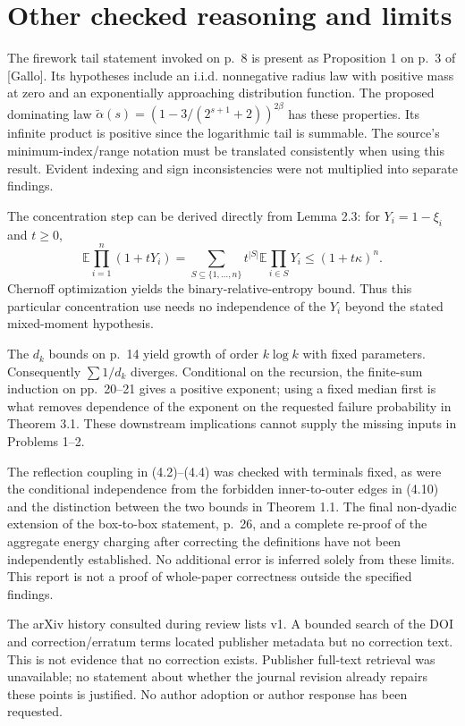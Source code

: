 \documentclass[10pt]{article}
\begin{document}
\section*{Other checked reasoning and limits}
The firework tail statement invoked on p. 8 is present as Proposition 1 on p. 3 of [Gallo]. Its hypotheses include an i.i.d. nonnegative radius law with positive mass at zero and an exponentially approaching distribution function. The proposed dominating law \(\widetilde\alpha(s)=(1-3/(2^{s+1}+2))^{2\beta}\) has these properties. Its infinite product is positive since the logarithmic tail is summable. The source’s minimum-index/range notation must be translated consistently when using this result. Evident indexing and sign inconsistencies were not multiplied into separate findings.\par
The concentration step can be derived directly from Lemma 2.3: for \(Y_i=1-\xi_i\) and \(t\ge0\), \[\mathbb E\prod_{i=1}^{n}(1+tY_i)
 =\sum_{S\subseteq\{1,\ldots,n\}}t^{|S|}\mathbb E\prod_{i\in S}Y_i
 \le(1+t\kappa)^n.\] Chernoff optimization yields the binary-relative-entropy bound. Thus this particular concentration use needs no independence of the \(Y_i\) beyond the stated mixed-moment hypothesis.\par
The \(d_k\) bounds on p. 14 yield growth of order \(k\log k\) with fixed parameters. Consequently \(\sum 1/d_k\) diverges. Conditional on the recursion, the finite-sum induction on pp. 20–21 gives a positive exponent; using a fixed median first is what removes dependence of the exponent on the requested failure probability in Theorem 3.1. These downstream implications cannot supply the missing inputs in Problems 1–2.\par
The reflection coupling in (4.2)–(4.4) was checked with terminals fixed, as were the conditional independence from the forbidden inner-to-outer edges in (4.10) and the distinction between the two bounds in Theorem 1.1. The final non-dyadic extension of the box-to-box statement, p. 26, and a complete re-proof of the aggregate energy charging after correcting the definitions have not been independently established. No additional error is inferred solely from these limits. This report is not a proof of whole-paper correctness outside the specified findings.\par
The arXiv history consulted during review lists v1. A bounded search of the DOI and correction/erratum terms located publisher metadata but no correction text. This is not evidence that no correction exists. Publisher full-text retrieval was unavailable; no statement about whether the journal revision already repairs these points is justified. No author adoption or author response has been requested.\par
\end{document}

